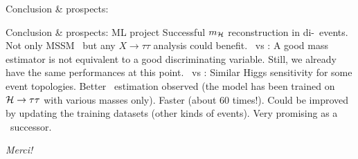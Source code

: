 \begin{frame}{Conclusion \& prospects: \HAtoTauTau}
\end{frame}

\begin{frame}{Conclusion \& prospects: ML project}
\manip Successful $m_{\mathcal{H}}$ reconstruction in di-\tau\ events.
\submanip Not only MSSM \HAtoTauTau\ but any $X\to\tau\tau$ analysis could benefit.
\manip \mml\ vs \mTtot:
\submanip A good mass estimator is not equivalent to a good discriminating variable.
\submanip Still, we already have the same performances at this point.
\manip \mml\ vs \msv:
\submanip Similar Higgs sensitivity for some event topologies.
\submanip Better \Zboson\ estimation observed (the model has been trained on $\mathcal{H}\to\tau\tau$ with various masses only).
\submanip Faster (about 60 times!).
\submanip Could be improved by updating the training datasets (other kinds of events).
\submanip Very promising as a \SVFIT\ successor.
\end{frame}

\begin{frame}{\emph{Merci!}}

\end{frame}